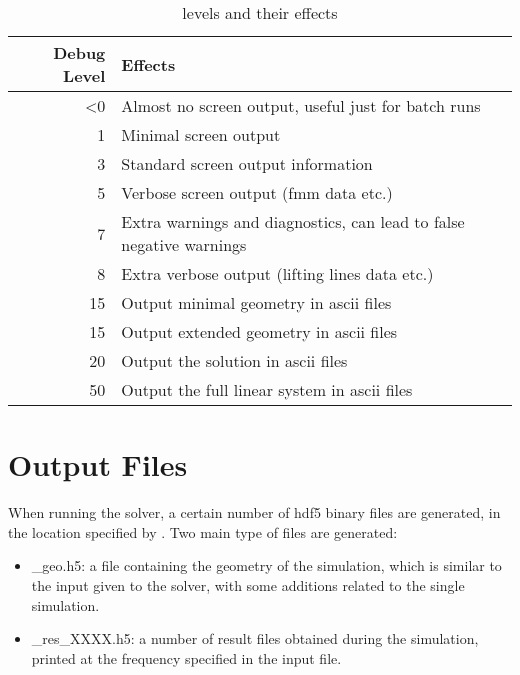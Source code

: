 \begin{table}[]
\centering
\begin{tabular}{@{}rl@{}}
\toprule
Debug Level & Effects \\ \midrule
<0            & Almost no screen output, useful just for batch runs        \\
1             & Minimal screen output        \\
3             & Standard screen output information         \\ 
5             & Verbose screen output (fmm data etc.)\\
7             & Extra warnings and diagnostics, can lead to false negative warnings\\ 
8             & Extra verbose output (lifting lines data etc.)\\\midrule
15            & Output minimal geometry in ascii files \\
15            & Output extended geometry in ascii files \\
20            & Output the solution in ascii files \\
50            & Output the full linear system in ascii files\\
\bottomrule
\end{tabular}
\caption{ levels and their effects}
\label{tab:debug_level}
\end{table}

\section{Output Files}
\label{sec:Solver_Output_Files}

When running the solver, a certain number of hdf5 binary files are generated, in the location specified by . Two main type of files are generated:
\begin{itemize}
    \item {}\_geo.h5: a file containing the geometry of the simulation, which is similar to the input given to the solver, with some additions related to the single simulation.
    \item {}\_res\_XXXX.h5: a number of result files obtained during the simulation, printed at the frequency specified in the input file. 
\end{itemize}